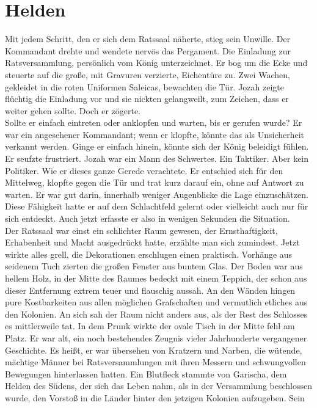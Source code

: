 
\chapter{Helden}

Mit jedem Schritt, den er sich dem Ratssaal näherte, stieg sein Unwille. Der Kommandant drehte und 
wendete nervös das Pergament. Die Einladung zur Ratsversammlung, persönlich vom König unterzeichnet. 
Er bog um die Ecke und steuerte auf die große, mit Gravuren verzierte, Eichentüre zu. Zwei Wachen, 
gekleidet in die roten Uniformen Saleicas, bewachten die Tür. Jozah zeigte flüchtig die Einladung 
vor und sie nickten gelangweilt, zum Zeichen, dass er weiter gehen sollte. Doch er zögerte.\\
 Sollte er einfach eintreten oder anklopfen und warten, bis er gerufen wurde? Er war ein angesehener 
Kommandant; wenn er klopfte, könnte das als Unsicherheit verkannt werden. Ginge er einfach hinein, 
könnte sich der König beleidigt fühlen. Er seufzte frustriert. Jozah war ein Mann des Schwertes. Ein 
Taktiker. Aber kein Politiker. Wie er dieses ganze Gerede verachtete. Er entschied sich für den 
Mittelweg, klopfte gegen die Tür und trat kurz darauf ein, ohne auf Antwort zu warten. Er war gut 
darin, innerhalb weniger Augenblicke die Lage einzuschätzen. Diese Fähigkeit hatte er auf dem 
Schlachtfeld gelernt oder vielleicht auch nur für sich entdeckt. Auch jetzt erfasste er also in 
wenigen Sekunden die Situation.\\ 
 Der Ratssaal war einst ein schlichter Raum gewesen, der Ernsthaftigkeit, Erhabenheit und Macht 
ausgedrückt hatte, erzählte man sich zumindest. Jetzt wirkte alles grell, die Dekorationen 
erschlugen einen praktisch. Vorhänge aus seidenem Tuch zierten die großen Fenster aus buntem Glas. 
Der Boden war aus hellem Holz, in der Mitte des Raumes bedeckt mit einem Teppich, der schon aus 
dieser Entfernung extrem teuer und flauschig aussah. An den Wänden hingen pure Kostbarkeiten aus 
allen möglichen Grafschaften und vermutlich etliches aus den Kolonien. An sich sah der Raum nicht 
anders aus, als der Rest des Schlosses es mittlerweile tat. In dem Prunk wirkte der ovale Tisch in 
der Mitte fehl am Platz. Er war alt, ein noch bestehendes Zeugnis vieler Jahrhunderte vergangener 
Geschichte. Es heißt, er war übersehen von Kratzern und Narben, die wütende, mächtige Männer bei 
Ratsversammlungen mit ihren Messern und schwungvollen Bewegungen hinterlassen hatten. Ein Blutfleck 
stammte von Garischa, dem Helden des Südens, der sich das Leben nahm, als in der Versammlung 
beschlossen wurde, den Vorstoß in die Länder hinter den jetzigen Kolonien aufzugeben. Sein 
